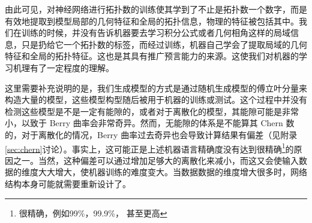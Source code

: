 由此可见，对神经网络进行拓扑数的训练使其学到了不止是拓扑数一个数字，而是有效地提取到模型局部的几何特征和全局的拓扑信息，物理的特征被包括其中。我们在训练的时候，并没有告诉机器要去学习积分公式或者几何相角这样的局域信息，只是扔给它一个拓扑数的标签，而经过训练，机器自己学会了提取局域的几何特征和全局的拓扑特征。这也是其具有推广预言能力的来源。这使我们对机器的学习机理有了一定程度的理解。

这里需要补充说明的是，我们生成模型的方式是通过随机生成模型的傅立叶分量来构造大量的模型，这些模型构型随后被用于机器的训练或测试。这个过程中并没有检测这些模型是不是一定有能隙的，或者对于离散化的模型，其能隙可能是非常小，以致于 Berry 曲率会非常奇异。然而，无能隙的体系是不能算其 Chern 数的，对于离散化的情况，Berry 曲率过去奇异也会导致计算结果有偏差（见附录\ref{sec:chern}讨论）。事实上，这可能正是上述机器语言精确度没有达到很精确\footnote{很精确，例如99\%，99.9\%， 甚至更高}的原因之一。当然，这种偏差可以通过增加足够大的离散化来减小，而这又会使输入数据的维度大大增大，使机器训练的难度变大。当数据数据的维度增大很多时，网络结构本身可能就需要重新设计了。



